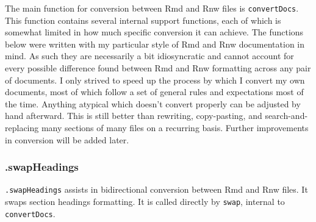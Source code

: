 \documentclass{article}\usepackage[]{graphicx}\usepackage[]{color}
\begin{document}
\title{}
\author{}
\maketitle





The main function for conversion between Rmd and Rnw files is \texttt{convertDocs}.
This function contains several internal support functions, each of which is somewhat limited in how much specific conversion it can achieve.
The functions below were written with my particular style of Rmd and Rnw documentation in mind.
As such they are necessarily a bit idiosyncratic and cannot account for every possible difference found between Rmd and Rnw formatting across any pair of documents.
I only strived to speed up the process by which I convert my own documents, most of which follow a set of general rules and expectations most of the time.
Anything atypical which doesn't convert properly can be adjusted by hand afterward.
This is still better than rewriting, copy-pasting, and search-and-replacing many sections of many files on a recurring basis.
Further improvements in conversion will be added later.

\subsubsection{.swapHeadings}
\texttt{.swapHeadings} assists in bidirectional conversion between Rmd and Rnw files.
It swaps section headings formatting.
It is called directly by \texttt{swap}, internal to \texttt{convertDocs}.
\end{document}

